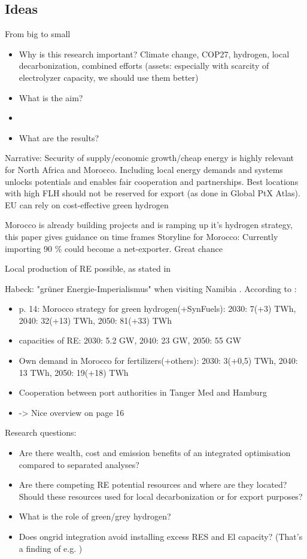 
\subsection{Ideas}
From big to small
\begin{itemize}
    \item Why is this research important? Climate change, COP27, hydrogen, local decarbonization, combined efforts (assets: especially with scarcity of electrolyzer capacity, we should use them better)
    \item What is the aim?
    \item 
    \item What are the results?
\end{itemize}
Narrative: 
Security of supply/economic growth/cheap energy is highly relevant for North Africa and Morocco. 
Including local energy demands and systems unlocks potentials and enables fair cooperation and partnerships.
Best locations with high FLH should not be reserved for export (as done in Global PtX Atlas). 
EU can rely on cost-effective green hydrogen

Morocco is already building projects and is ramping up it's hydrogen strategy, this paper gives guidance on time frames
Storyline for Morocco: Currently importing 90 \% could become a net-exporter. Great chance


Local production of RE possible, as stated in \cite{Ersoy2022}

Habeck: "gr{\"u}ner Energie-Imperialismus" when visiting Namibia \cite{HabeckEnergieimperialismus}.
According to \cite{Ersoy2022}:
\begin{itemize}
    \item p. 14: Morocco strategy for green hydrogen(+SynFuels): 2030: 7(+3) TWh, 2040: 32(+13) TWh, 2050: 81(+33) TWh
    \item capacities of RE: 2030: 5.2 GW, 2040: 23 GW, 2050: 55 GW
    \item Own demand in Morocco for fertilizers(+others): 2030: 3(+0,5) TWh, 2040: 13 TWh, 2050: 19(+18) TWh 
    \item Cooperation between port authorities in Tanger Med and Hamburg
    \item -> Nice overview on page 16
\end{itemize}

Research questions:
\begin{itemize}
    \item Are there wealth, cost and emission benefits of an integrated optimisation compared to separated analyses?
    \item Are there competing RE potential resources and where are they located? Should these resources used for local decarbonization or for export purposes?
    \item What is the role of green/grey hydrogen?   
    \item Does ongrid integration avoid installing excess RES and El capacity? (That's a finding of e.g. \cite{Ruhnau2022})
\end{itemize}

